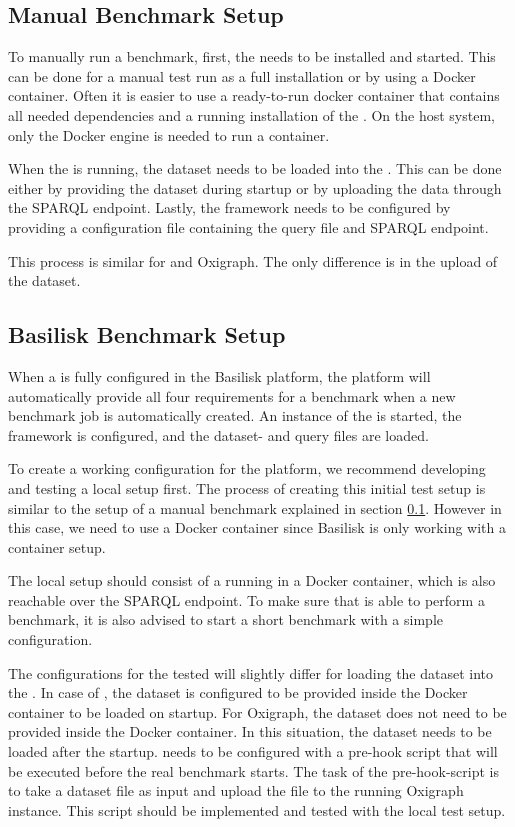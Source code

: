 \subsection{Manual Benchmark Setup}
\label{sec:eval_manual_benchmark_setup}
To manually run a benchmark, first, the \ts{} needs to be installed and started.
This can be done for a manual test run as a full installation or by using a Docker container.
Often it is easier to use a ready-to-run docker container that contains all needed dependencies and a running installation of the \ts{}.
On the host system, only the Docker engine is needed to run a container.

When the \ts{} is running, the dataset needs to be loaded into the \ts{}.
This can be done either by providing the dataset during startup or by uploading the data through the SPARQL endpoint.
Lastly, the \iguana{} framework needs to be configured by providing a configuration file containing the query file and SPARQL endpoint.

This process is similar for \tentris{} and Oxigraph.
The only difference is in the upload of the dataset.


\subsection{Basilisk Benchmark Setup}
When a \ts{} is fully configured in the Basilisk platform, the platform will automatically provide all four requirements for a benchmark when a new benchmark job is automatically created.
An instance of the \ts{} is started, the \iguana{} framework is configured, and the dataset- and query files are loaded.

To create a working \ts{} configuration for the platform, we recommend developing and testing a local setup first.
The process of creating this initial test setup is similar to the setup of a manual benchmark explained in section \ref{sec:eval_manual_benchmark_setup}.
However in this case, we need to use a Docker container since Basilisk is only working with a container setup.

The local setup should consist of a \ts{} running in a Docker container, which is also reachable over the SPARQL endpoint.
To make sure that \iguana{} is able to perform a benchmark, it is also advised to start a short benchmark with a simple \iguana{} configuration.

The \iguana{} configurations for the tested \tsp{} will slightly differ for loading the dataset into the \ts{}.
In case of \tentris{}, the dataset is configured to be provided inside the Docker container to be loaded on startup.
For Oxigraph, the dataset does not need to be provided inside the Docker container.
In this situation, the dataset needs to be loaded after the startup.
\iguana{} needs to be configured with a pre-hook script that will be executed before the real benchmark starts.
The task of the pre-hook-script is to take a dataset file as input and upload the file to the running Oxigraph instance.
This script should be implemented and tested with the local test setup.

